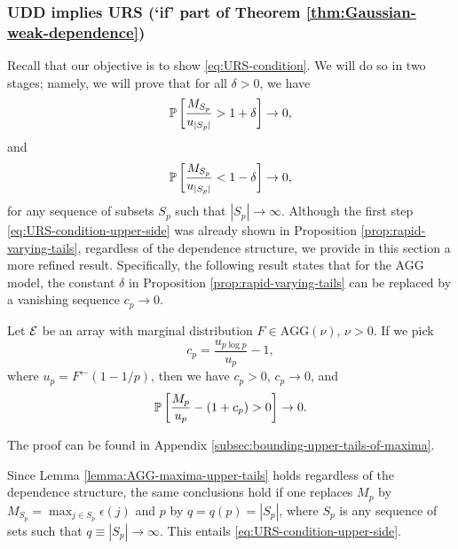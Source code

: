 \subsubsection{{\bf UDD implies URS (`if' part of Theorem \ref{thm:Gaussian-weak-dependence})}} \label{subsubsec:UDD=>URS}

Recall that our objective is to show \eqref{eq:URS-condition}. 
We will do so in two stages; namely, we will prove that for all $\delta>0$, we have 
\begin{equation} \label{eq:URS-condition-upper-side}
    \P\left[\frac{M_{S_p}}{u_{|S_p|}} > 1+\delta\right] \to 0,
\end{equation}
and
\begin{equation} \label{eq:URS-condition-lower-side}
    \P\left[\frac{M_{S_p}}{u_{|S_p|}} < 1-\delta\right] \to 0,
\end{equation}
for any sequence of subsets $S_p$ such that $|S_p|\to\infty$.
Although the first step \eqref{eq:URS-condition-upper-side} was already shown in Proposition \ref{prop:rapid-varying-tails}, regardless of the dependence structure, we provide in this section a more refined result. 
Specifically, the following result states that for the AGG model, the constant $\delta$ in Proposition \ref{prop:rapid-varying-tails} can be replaced by a vanishing sequence $c_p\to 0$.

\begin{lemma} \label{lemma:AGG-maxima-upper-tails}
Let ${\cal E}$ be an array with marginal distribution $F\in\text{AGG}(\nu)$, $\nu>0$. If we pick
\begin{equation} \label{eq:choice-of-c_p}
    c_p = \frac{u_{p\log{p}}}{u_p} - 1,    
\end{equation} 
where $u_p = F^{\leftarrow}(1-1/p)$, then we have $c_p>0$, $c_p\to 0$, and
\begin{equation} \label{eq:AGG-max-upper-bound}
    \P\left[\frac{M_p}{u_p}-(1+c_p) > 0\right] \to 0.
 \end{equation}
\end{lemma}
The proof can be found in Appendix \ref{subsec:bounding-upper-tails-of-maxima}.

Since Lemma \ref{lemma:AGG-maxima-upper-tails} holds regardless of the dependence structure, the same conclusions hold if one replaces $M_p$ by $M_{S_p} = \max_{j\in S_p}\epsilon(j)$ and $p$ by $q = q(p)=|S_p|$, where $S_p$ is any sequence of sets such that $q \equiv |S_p| \to \infty$.
This entails \eqref{eq:URS-condition-upper-side}.

